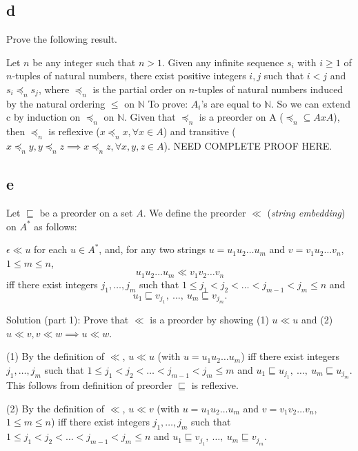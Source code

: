 \documentclass[12pt]{article}
\begin{document}
\subsection*{d}
Prove the following result.

\medskip
Let $n$ be any  integer such that $n>1$.
Given any infinite sequence $s_i$ with $i \ge 1$ of $n$-tuples of
natural numbers, there exist positive integers $i, j$ such that
$i<j$ and $s_{i}\preceq_{n} s_{j}$, where $\preceq_{n}$ is the
partial order on $n$-tuples of natural numbers
induced by the natural ordering $\le$ on $\mathbb{N}$
To prove: $A_i$'s are equal to $\mathbb{N}$. So we can extend c by induction on $\preceq_{n}$ on $\mathbb{N}$.
Given that $\preceq_{n}$ is a preorder on A ($\preceq_{n} \subseteq AxA$), then $\preceq_{n}$ is reflexive ($ x \preceq_{n} x,\forall x \in A$)
and transitive ($x \preceq_{n} y, y \preceq_{n} z \implies x \preceq_{n} z, \forall x,y,z \in A$). NEED COMPLETE PROOF HERE.

\subsection*{e}

Let $\sqsubseteq$ be a preorder on a set $A$. We define the
preorder $\ll$ ({\it string embedding\/})
on $A^{*}$ as follows:

\medskip\noindent
$\epsilon \ll u$ for each $u\in A^{*}$, and,
for any two strings $u=u_{1}u_{2}\ldots u_{m}$ and
$v=v_{1}u_{2}\ldots v_{n}$, $1\leq m\leq n$,
$$u_{1}u_{2}\ldots u_{m} \ll v_{1}v_{2}\ldots v_{n}$$
iff there exist  integers $j_{1},\ldots,j_{m}$ such that
$1\leq j_{1} < j_{2} < \ldots < j_{m-1} < j_{m} \leq n$ and
$$u_{1} \sqsubseteq v_{j_{1}},\ \ldots,\ u_{m} \sqsubseteq v_{j_{m}}.$$

\medskip

Solution (part 1): Prove that $\ll$ is a preorder by showing (1) $u \ll u$ and (2) $u \ll v, v \ll w \implies u \ll w$.

\medskip

(1) By the definition of $\ll$, $u \ll u$ (with $u=u_{1}u_{2}\ldots u_{m}$) iff there exist integers $j_{1},\ldots,j_{m}$ such that
$1\leq j_{1} < j_{2} < \ldots < j_{m-1} < j_{m} \leq m$ and
$u_{1} \sqsubseteq u_{j_{1}},\ \ldots,\ u_{m} \sqsubseteq u_{j_{m}}.$ This follows from definition of preorder $\sqsubseteq $
is reflexive.

\medskip

(2) By the definition of $\ll$, $u \ll v$ (with $u=u_{1}u_{2}\ldots u_{m}$ and
$v=v_{1}v_{2}\ldots v_{n}$, $1\leq m\leq n$) iff there exist integers $j_{1},\ldots,j_{m}$ such that
$1\leq j_{1} < j_{2} < \ldots < j_{m-1} < j_{m} \leq n$ and
$u_{1} \sqsubseteq v_{j_{1}},\ \ldots,\ u_{m} \sqsubseteq v_{j_{m}}.$
\end{document}
